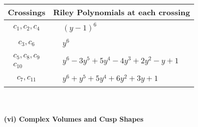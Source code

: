 \documentclass[1p]{elsarticle_modified}
\theoremstyle{definition}
\begin{document}
\begin{tabular}{m{50pt}|m{274pt}}
Crossings & \hspace{64pt}Riley Polynomials at each crossing \\
\hline $$\begin{aligned}c_{1},c_{2},c_{4}\end{aligned}$$&$\begin{aligned}
&(y-1)^6
\end{aligned}$\\
\hline $$\begin{aligned}c_{3},c_{6}\end{aligned}$$&$\begin{aligned}
&y^6
\end{aligned}$\\
\hline $$\begin{aligned}c_{5},c_{8},c_{9}\\c_{10}\end{aligned}$$&$\begin{aligned}
&y^6-3 y^5+5 y^4-4 y^3+2 y^2- y+1
\end{aligned}$\\
\hline $$\begin{aligned}c_{7},c_{11}\end{aligned}$$&$\begin{aligned}
&y^6+y^5+5 y^4+6 y^2+3 y+1
\end{aligned}$\\
\hline
\end{tabular}\\~\\
\newpage\flushleft \textbf{(vi) Complex Volumes and Cusp Shapes}
\end{document}
